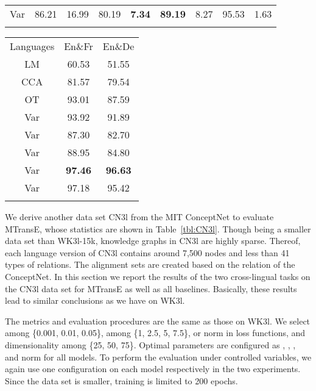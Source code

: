 \documentclass{article}
\begin{document}
\begin{table*}[t!]
\begin{minipage}[t]{0.63\linewidth}
\begin{tabular}{c|cc|cc|cc|cc}
Var&\multicolumn{1}{c}{86.21}&\multicolumn{1}{c|}{16.99}&\multicolumn{1}{c}{80.19}&\multicolumn{1}{c|}{\textbf{7.34}}&\multicolumn{1}{c}{\textbf{89.19}}&\multicolumn{1}{c|}{8.27}&\multicolumn{1}{c}{95.53}&\multicolumn{1}{c}{1.63}\\
\bhline
\end{tabular}
\end{minipage}
\hfill
\begin{minipage}[t]{0.3\linewidth}
\centering
\captionsetup{justification=centering}
\caption{Accuracy of triple-wise alignment verification (\%).}\label{tbl:alignmentcn}
\label{table:CN3l TWA}
{\scriptsize
\begin{tabular}{c|cc}
\bhline
Languages &  En\&Fr & En\&De\\
\bhline
LM&60.53&51.55\\
CCA&81.57&79.54\\
OT&93.01&87.59\\
\hline
Var&93.92&91.89\\
Var&87.30&82.70\\
Var&88.95&84.80\\
Var&\textbf{97.46}&\textbf{96.63}\\
Var&97.18&95.42\\
\bhline
\end{tabular}
}
\end{minipage}
\vspace{-1em}
\end{table*}		


We derive another data set CN3l from the MIT ConceptNet to evaluate MTransE, whose statistics are shown in Table~\ref{tbl:CN3l}.
Though being a smaller data set than WK3l-15k, knowledge graphs in CN3l are highly sparse.
Thereof, each language version of CN3l contains around 7,500 nodes and less than 41 types of relations.
The alignment sets are created based on the relation  of the ConceptNet.
In this section we report the results of the two cross-lingual tasks on the CN3l data set for MTransE as well as all baselines.
Basically, these results lead to similar conclusions as we have on WK3l.

 The metrics and evaluation procedures are the same as those on WK3l.
We select  among \{0.001, 0.01, 0.05\},  among \{1, 2.5, 5, 7.5\},  or  norm in loss functions, and dimensionality  among \{25, 50, 75\}.
Optimal parameters are configured as , , , and  norm for all models.
To perform the evaluation under controlled variables, we again use one configuration on each model respectively in the two experiments.
Since the data set is smaller, training is limited to 200 epochs.
\end{document}
